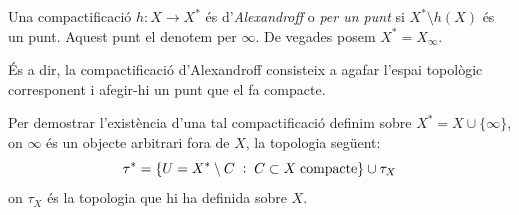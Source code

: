 \documentclass[../main.tex]{subfiles}
\begin{document}
\begin{defi}
 Una compactificació $h:X\rightarrow X^*$ és d'\textit{Alexandroff} o \textit{per un punt} si $X^*\setminus h(X)$ és un punt. Aquest punt el denotem per $\infty$. De vegades posem $X^* = X_\infty$.
\end{defi}

És a dir, la compactificació d'Alexandroff consisteix a agafar l'espai topològic corresponent i afegir-hi un punt que el fa compacte.

Per demostrar l'existència d'una tal compactificació definim sobre $X^* = X\cup\{\infty\}$, on $\infty$ és un objecte arbitrari fora de $X$, la topologia següent:
\begin{equation}
    \notag
    \tau^* = \{U = X^*\setminus C\;:\; C\subset X\;\text{compacte}\}\cup\tau_X
\end{equation}
on $\tau_X$ és la topologia que hi ha definida sobre $X$.
\end{document}

